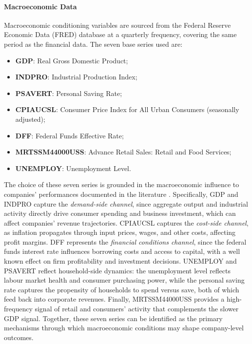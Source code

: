 \documentclass[a4paper,fleqn]{cas-dc}
\begin{document}
\paragraph{Macroeconomic Data}
Macroeconomic conditioning variables are sourced from the Federal Reserve Economic Data (FRED) database at a quarterly frequency, covering the same period as the financial data. The seven base series used are: 
\begin{itemize}
  \item \textbf{GDP}: Real Gross Domestic Product;
  \item \textbf{INDPRO}: Industrial Production Index;
  \item \textbf{PSAVERT}: Personal Saving Rate;
  \item \textbf{CPIAUCSL}: Consumer Price Index for All Urban Consumers
        (seasonally adjusted);
  \item \textbf{DFF}: Federal Funds Effective Rate;
  \item \textbf{MRTSSM44000USS}: Advance Retail Sales: Retail and Food Services;
  \item \textbf{UNEMPLOY}: Unemployment Level.
\end{itemize}
The choice of these seven series is grounded in the macroeconomic influence to companies' performances documented in the literature \citep{jefri2024exploring}. Specifically, GDP and INDPRO capture the \emph{demand-side channel}, since aggregate output and industrial activity directly drive consumer spending and business investment, which can affect companies' revenue trajectories. CPIAUCSL captures the \emph{cost-side channel}, as inflation propagates through input prices, wages, and other costs, affecting profit margins. DFF represents the \emph{financial conditions channel}, since the federal funds interest rate influences borrowing costs and access to capital, with a well known effect on firm profitability and investment decisions. UNEMPLOY and PSAVERT reflect household-side dynamics: the unemployment level reflects labour market health and consumer purchasing power, while the personal saving rate captures the propensity of households to spend versus save, both of which feed back into corporate revenues. Finally, MRTSSM44000USS provides a high-frequency signal of retail and consumers' activity that complements the slower GDP signal. Together, these seven series can be identified as the primary mechanisms through which macroeconomic conditions may shape company-level outcomes.
\end{document}
